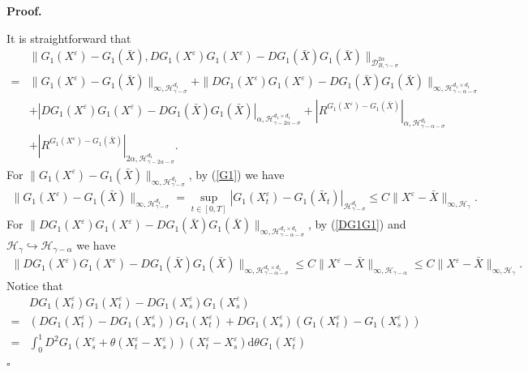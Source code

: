 \documentclass[10pt,a4paper]{article}
\numberwithin{equation}{section}
\newenvironment{proof}[1][\normalfont\bfseries Proof]{%
	\noindent #1.\hspace{0.5em}%
	\ignorespaces%
}{%
	\hfill $\square$%
	\par%
}
\begin{document}
\begin{proof}
	It is straightforward that
	\begin{align*}
		&\|G_1(X^\varepsilon)-G_1(\bar{X}),DG_1(X^\varepsilon)G_1(X^\varepsilon)-DG_1(\bar{X})G_1(\bar{X})\|_{\mathcal{D}_{ B,\gamma-\sigma}^{2\alpha}} \\
		=&\|G_1(X^\varepsilon)-G_1(\bar{X})\|_{\infty, \mathcal H_{\gamma-\sigma}^{d_1}}	
		+\|DG_1(X^\varepsilon)G_1(X^\varepsilon)-DG_1(\bar{X})G_1(\bar{X})\|_{\infty, \mathcal H_{\gamma-\alpha-\sigma}^{d_1 \times d_1}} \\
		&+|DG_1(X^\varepsilon)G_1(X^\varepsilon)-DG_1(\bar{X})G_1(\bar{X})|_{\alpha, \mathcal H_{\gamma-2\alpha-\sigma}^{d_1 \times d_1} }
		+|R^{G_1(X^\varepsilon)-G_1(\bar{X})}|_{\alpha, \mathcal H_{\gamma-\alpha-\sigma}^{d_1}} \\
		&+|R^{G_1(X^\varepsilon)-G_1(\bar{X})}|_{2\alpha, \mathcal H_{\gamma-2\alpha-\sigma}^{d_1}}.
	\end{align*}	
	For $\|G_1(X^\varepsilon)-G_1(\bar{X})\|_{\infty, \mathcal H_{\gamma-\sigma}^{d_1}}$, by (\ref{G1}) we have
	\begin{align}\label{Gdif1}
		\|G_1(X^\varepsilon)-G_1(\bar{X})\|_{\infty, \mathcal H_{\gamma-\sigma}^{d_1}}
		=\sup_{t\in [0,T]} |G_1(X_t^\varepsilon)-G_1(\bar{X}_t)|_{\mathcal H_{\gamma-\sigma}^{d_1}}
		\leq C\|X^\varepsilon-\bar{X}\|_{\infty, \mathcal H_{\gamma}}.
	\end{align}	
	For $\|DG_1(X^\varepsilon)G_1(X^\varepsilon)-DG_1(\bar{X})G_1(\bar{X})\|_{\infty, \mathcal H_{\gamma-\alpha-\sigma}^{d_1 \times d_1}} $, by (\ref{DG1G1}) and $\mathcal H_\gamma \hookrightarrow \mathcal H_{\gamma-\alpha}$ we have
	\begin{align}\label{Gdif2}
		\|DG_1(X^\varepsilon)G_1(X^\varepsilon)-DG_1(\bar{X})G_1(\bar{X})\|_{\infty, \mathcal H_{\gamma-\alpha-\sigma}^{d_1 \times d_1}}
		\leq C\|X^\varepsilon-\bar{X}\|_{\infty, \mathcal H_{\gamma-\alpha}}
		\leq C\|X^\varepsilon-\bar{X}\|_{\infty, \mathcal H_{\gamma}}.
	\end{align}
	Notice that	
	\begin{align*}
		&DG_1(X_t^\varepsilon)G_1(X_t^\varepsilon)-DG_1(X_s^\varepsilon)G_1(X_s^\varepsilon) \nonumber\\
		=&(DG_1(X_t^\varepsilon)-DG_1(X_s^\varepsilon)) G_1(X_t^\varepsilon)
		+DG_1(X_s^\varepsilon)(G_1(X_t^\varepsilon)-G_1(X_s^\varepsilon)) \nonumber\\
		=& \int_0^1 D^2 G_1 (X_s^\varepsilon+\theta(X_t^\varepsilon-X_s^\varepsilon)) (X_t^\varepsilon-X_s^\varepsilon) \mathrm{d} \theta G_1(X_t^\varepsilon)

\end{align*}
\end{proof}
\end{document}

